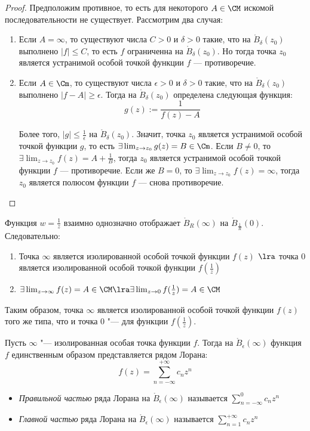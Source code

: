 \begin{proof}
	Предположим противное, то есть для некоторого $A \in \CM$ искомой последовательности не существует. Рассмотрим два случая:
	\begin{enumerate}
		\item Если $A = \infty$, то существуют числа $C > 0$ и $\delta > 0$ такие, что на $\mathring B_\delta(z_0)$ выполнено $|f| \le C$, то есть $f$ ограниченна на $\mathring B_\delta(z_0)$. Но тогда точка $z_0$ является устранимой особой точкой функции $f$ --- противоречие.
		
		\item Если $A \in \Cm$, то существуют числа $\epsilon > 0$ и $\delta > 0$ такие, что на $\mathring B_\delta(z_0)$ выполнено $|f - A| \ge \epsilon$. Тогда на $\mathring B_\delta(z_0)$ определена следующая функция:
		\[g(z) := \frac{1}{f(z) - A}\]
		
		Более того, $|g| \le \frac1\epsilon$ на $\mathring B_\delta(z_0)$. Значит, точка $z_0$ является устранимой особой точкой функции $g$, то есть $\exists \lim_{z \to z_0} g(z) = B \in \Cm$. Если $B \ne 0$, то $\exists \lim_{z \to z_0} f(z) = A + \frac1B$, тогда $z_0$ является устранимой особой точкой функции $f$ --- противоречие. Если же $B = 0$, то $\exists \lim_{z \to z_0} f(z) = \infty$, тогда $z_0$ является полюсом функции $f$ --- снова противоречие.\qedhere
	\end{enumerate}
\end{proof}

\begin{note}
	Функция $w = \frac1z$ взаимно однозначно отображает $\mathring B_R(\infty)$ на $\mathring B_{\frac1R}(0)$. Следовательно:
	\begin{enumerate}
		\item Точка $\infty$ является изолированной особой точкой функции $f(z)$ $\lra$ точка $0$ является изолированной особой точкой функции $f(\frac1z)$
		\item $\exists \lim_{z \to \infty}f(z) = A \in \CM \lra \exists \lim_{z \to 0}f(\frac1z) = A \in \CM$
	\end{enumerate}
	
	Таким образом, точка $\infty$ является изолированной особой точкой функции $f(z)$ того же типа, что и точка $0$ "--- для функции $f(\frac1z)$.
\end{note}

\begin{definition}
	Пусть $\infty$ "--- изолированная особая точка функции $f$. Тогда на $\mathring B_\epsilon(\infty)$ функция $f$ единственным образом представляется рядом Лорана:
	\[f(z) = \sum_{n = -\infty}^{+\infty}c_nz^n\]
	\begin{itemize}
		\item \textit{Правильной частью} ряда Лорана на $\mathring B_\epsilon(\infty)$ называется $\sum_{n = -\infty}^{0}c_nz^n$
		\item \textit{Главной частью} ряда Лорана на $\mathring B_\epsilon(\infty)$ называется $\sum_{n = 1}^{+\infty}c_nz^n$
	\end{itemize}
\end{definition}

